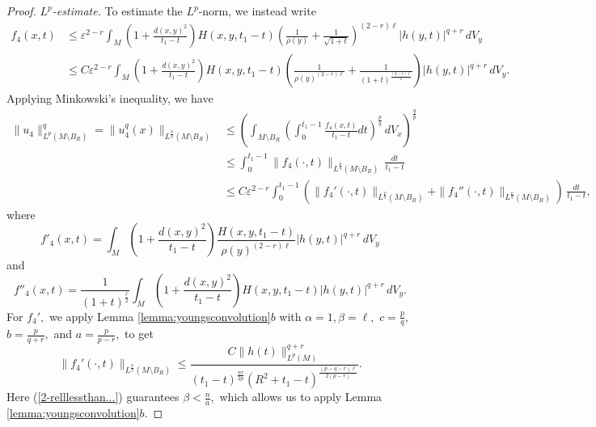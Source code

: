 \documentclass[12pt]{amsart}
\renewcommand{\1}{{\mathbf 1}}
\newcommand{\eps}{{\varepsilon}}
\theoremstyle{others}
\numberwithin{equation}{section}
\begin{document}
\begin{proof}
   \noindent \emph{$L^p$-estimate.} To estimate the $L^p$-norm, we instead write
    \begin{equation*}
       \begin{split}
           f_4(x,t) & \leq \eps^{2 - r} \int_M \left( 1 + \frac{d(x,y)^2  }{t_1 - t } \right) H(x,y,t_1 - t) \left( \frac{1}{\rho(y)} + \frac{1}{\sqrt{1 + t}} \right)^{(2 - r)\ell} |h(y,t)|^{q + r} \, dV_y \\
           & \leq C \eps^{2 - r} \int_M \left( 1 + \frac{d(x,y)^2  }{t_1 - t } \right) H(x,y,t_1 - t) \left( \frac{1}{\rho(y)^{(2 - r) \ell} } + \frac{1}{(1 + t)^{\frac{(2 - r)\ell}{2}}} \right) |h(y,t)|^{q + r} \, dV_y.
           \end{split}
           \end{equation*}
    Applying Minkowski's inequality, we have
     \begin{equation}\label{u4Lpfirstest}
     \begin{split}
        \| u_4\|^q_{L^{p}(M \setminus B_R)} = \| u_4^q(x) \|_{L^{\frac{p}{q}}(M \setminus B_R)} & \leq \left( \int_{M \setminus B_R} \left( \int_{0}^{t_1 - 1} \frac{f_4(x,t)}{t_1 - t} dt \right)^{\frac{p}{q}} \, dV_x \right)^{\frac{q}{p}} \\
        & \leq \int_{0}^{t_1 - 1} \|f_4(\cdot, t) \|_{L^{\frac{p}{q}}(M \setminus B_R)} \, \frac{dt}{t_1 - t} \\
        & \leq C \eps^{2 - r} \int_{0}^{t_1 - 1} \left( \|f_4'(\cdot, t) \|_{L^{\frac{p}{q}}(M \setminus B_R)} + \|f_4''(\cdot, t) \|_{L^{\frac{p}{q}}(M \setminus B_R)} \right) \, \frac{dt}{t_1 - t },
        \end{split}
    \end{equation}
    where
         $$f'_4(x,t) =  \int_M \left( 1 + \frac{d(x,y)^2  }{t_1 - t } \right) \frac{H(x,y,t_1 - t) }{ \rho(y)^{(2 - r)\ell } } |h(y,t)|^{q + r} \, dV_y$$
     and
     $$f''_4(x,t) = \frac{1}{(1 + t)^{\frac{\ell}{2}} } \int_M \left( 1 + \frac{d(x,y)^2  }{t_1 - t } \right) H(x,y,t_1 - t)  |h(y,t)|^{q + r} \, dV_y.$$
          For $f_4',$ we apply Lemma \ref{lemma:youngsconvolution}$b$ with $\alpha = 1, \beta = \ell,$ $c = \frac{p}{q},$ $b = \frac{p}{q + r},$ and $a = \frac{p}{p-r},$ to get
    $$\|f_4'(\cdot, t) \|_{L^{\frac{p}{q}}(M \setminus B_R)} \leq \frac{C \|h(t) \|_{L^p(M)}^{q + r} }{ (t_1 - t)^{\frac{n r}{2p} } \left( R^2 + t_1 -t \right)^{ \frac{ \left( p - q - r \right) \ell}{2(p-r)} } }.$$
    Here (\ref{2-relllessthan...}) guarantees $\beta < \frac{n}{a},$ which allows us to apply Lemma \ref{lemma:youngsconvolution}$b$.
    

\end{proof}
\end{document}

